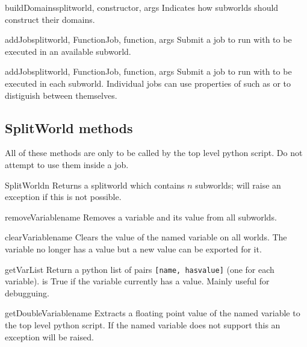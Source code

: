\begin{funcdesc}{buildDomains}{splitworld, constructor, args}
Indicates how subworlds should construct their domains.
\end{funcdesc}

\begin{funcdesc}{addJob}{splitworld, FunctionJob, function, args}
Submit a job to run  with  to be executed in an available subworld.
\end{funcdesc}

\begin{funcdesc}{addJob}{splitworld, FunctionJob, function, args}
Submit a job to run  with  to be executed in each subworld.
Individual jobs can use properties of  such as  or  to distiguish between
themselves.
\end{funcdesc}

\subsection{SplitWorld methods}
All of these methods are only to be called by the top level python script.
Do not attempt to use them inside a job.

\begin{methoddesc}[SplitWorld]{SplitWorld}{n}
Returns a splitworld which contains $n$ subworlds; will raise an exception if this is not possible.
\end{methoddesc}

\begin{methoddesc}[SplitWorld]{removeVariable}{name}
Removes a variable and its value from all subworlds.
\end{methoddesc}

\begin{methoddesc}[SplitWorld]{clearVariable}{name}
Clears the value of the named variable on all worlds.
The variable no longer has a value but a new value can be exported for it.
\end{methoddesc}

\begin{methoddesc}[SplitWorld]{getVarList}{}
Return a python list of pairs \texttt{[name, hasvalue]} (one for each variable).
 is True if the variable currently has a value.
Mainly useful for debugguing.
\end{methoddesc}

\begin{methoddesc}[SplitWorld]{getDoubleVariable}{name}
Extracts a floating point value of the named variable to the top level python script.
If the named variable does not support this an exception will be raised.
\end{methoddesc}

